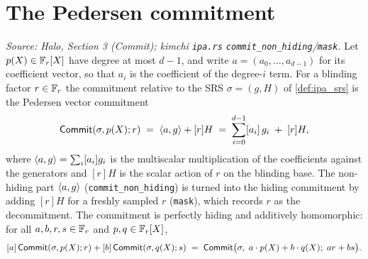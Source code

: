 \section{The Pedersen commitment}

\begin{definition}
  \label{def:ipa_commit}
  \textit{Source: Halo, Section 3 (Commit); kimchi \texttt{ipa.rs}
  \texttt{commit\_non\_hiding}/\texttt{mask}.}
  Let \(p(X) \in \mathbb{F}_r[X]\) have degree at most \(d - 1\), and write
  \(a = (a_{0}, \dots, a_{d-1})\) for its coefficient vector, so that \(a_{i}\) is
  the coefficient of the degree-\(i\) term. For a blinding factor \(r \in \mathbb{F}_r\) the
  commitment relative to the SRS \(\sigma = (g, H)\) of \cref{def:ipa_srs} is the
  Pedersen vector commitment
  \[
    \mathsf{Commit}(\sigma, p(X); r) \;=\; \langle a, g \rangle + [r]H
    \;=\; \sum_{i=0}^{d-1} [a_{i}]\, g_{i} \;+\; [r]H,
  \]
  where \(\langle a, g \rangle = \sum_{i} [a_{i}] g_{i}\) is the multiscalar
  multiplication of the coefficients against the generators and \([r]H\) is the
  scalar action of \(r\) on the blinding base. The non-hiding part
  \(\langle a, g \rangle\) (\texttt{commit\_non\_hiding}) is turned into the hiding
  commitment by adding \([r]H\) for a freshly sampled \(r\) (\texttt{mask}),
  which records \(r\) as the decommitment. The commitment is perfectly hiding and
  additively homomorphic: for all \(a, b, r, s \in \mathbb{F}_r\) and \(p, q \in \mathbb{F}_r[X]\),
  \[
    [a]\,\mathsf{Commit}(\sigma, p(X); r) + [b]\,\mathsf{Commit}(\sigma, q(X); s)
      \;=\; \mathsf{Commit}\bigl(\sigma,\; a \cdot p(X) + b \cdot q(X);\; a r + b s\bigr).
  \]
\end{definition}

